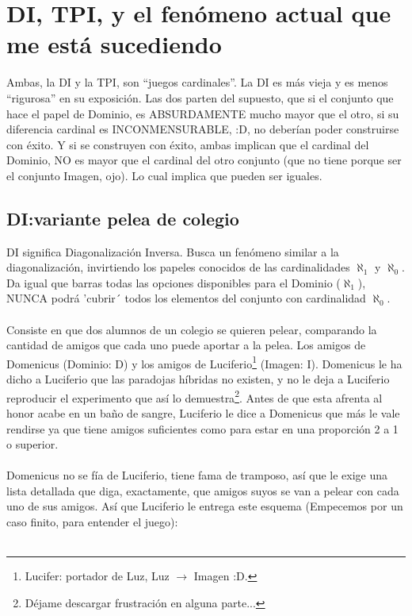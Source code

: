 \chapter{DI, TPI, y el fenómeno actual que me está sucediendo}

	\noindent
	Ambas, la DI y la TPI, son ``juegos cardinales''. La DI es más vieja y es menos ``rigurosa'' en su exposición. Las dos parten del supuesto, que si el conjunto que hace el papel de Dominio, es ABSURDAMENTE mucho mayor que el otro, si su diferencia cardinal es INCONMENSURABLE, :D, no deberían poder construirse con éxito. Y si se construyen con éxito, ambas implican que el cardinal del Dominio, NO es mayor que el cardinal del otro conjunto (que no tiene porque ser el conjunto Imagen, ojo). Lo cual implica que pueden ser iguales.

	\section{DI:variante pelea de colegio}
	
	\noindent
	DI significa Diagonalización Inversa. Busca un fenómeno similar a la diagonalización, invirtiendo los papeles conocidos de las cardinalidades $\aleph_{1}$ y $\aleph_{0}$. Da igual que barras todas las opciones disponibles para el Dominio ($\aleph_{1}$), NUNCA podrá 'cubrir´ todos los elementos del conjunto con cardinalidad $\aleph_{0}$.
	\\\\
	
	\noindent
	Consiste en que dos alumnos de un colegio se quieren pelear, comparando la cantidad de amigos que cada uno puede aportar a la pelea. Los amigos de Domenicus (Dominio: D) y los amigos de Luciferio\footnote{Lucifer: portador de Luz, Luz $\rightarrow$ Imagen :D.} (Imagen: I). Domenicus le ha dicho a Luciferio que las paradojas híbridas no existen, y no le deja a Luciferio reproducir el experimento que así lo demuestra\footnote{Déjame descargar frustración en alguna parte...}. Antes de que esta afrenta al honor acabe en un baño de sangre, Luciferio le dice a Domenicus que más le vale rendirse ya que tiene amigos suficientes como para estar en una proporción 2 a 1 o superior.
	\\\\
	
	\noindent
	Domenicus no se fía de Luciferio, tiene fama de tramposo, así que le exige una lista detallada que diga, exactamente, que amigos suyos se van a pelear con cada uno de sus amigos. Así que Luciferio le entrega este esquema (Empecemos por un caso finito, para entender el juego):
	\\\\
	

